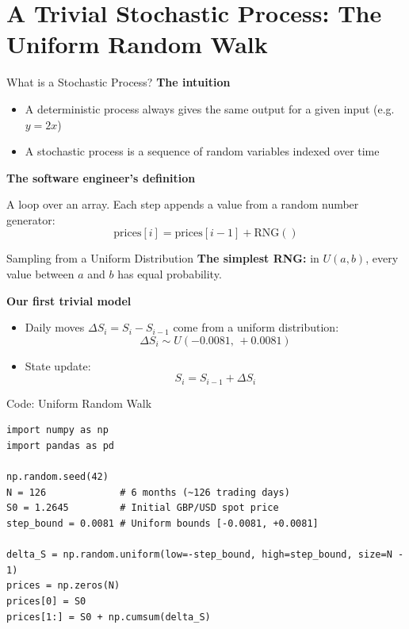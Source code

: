 \documentclass[aspectratio=169,11pt]{beamer}
\begin{document}
\section{A Trivial Stochastic Process: The Uniform Random Walk}

\begin{frame}{What is a Stochastic Process?}
  \textbf{The intuition}
  \begin{itemize}
    \item A deterministic process always gives the same output for a given input (e.g.\ $y = 2x$)
    \item A \alert{stochastic process} is a sequence of random variables indexed over time
  \end{itemize}
  \bigskip

  \textbf{The software engineer's definition}

  A loop over an array. Each step appends a value from a random number generator:
  \[
    \text{prices}[i] = \text{prices}[i-1] + \text{RNG}()
  \]
\end{frame}

\begin{frame}{Sampling from a Uniform Distribution}
  \textbf{The simplest RNG:} in $U(a, b)$, every value between $a$ and $b$ has equal probability.
  \bigskip

  \textbf{Our first trivial model}
  \begin{itemize}
    \item Daily moves $\Delta S_i = S_i - S_{i-1}$ come from a uniform distribution:
    \[
      \Delta S_i \sim U(-0.0081,\, +0.0081)
    \]
    \item State update:
    \[
      S_i = S_{i-1} + \Delta S_i
    \]
  \end{itemize}
\end{frame}

\begin{frame}[fragile]{Code: Uniform Random Walk}
\begin{lstlisting}
import numpy as np
import pandas as pd

np.random.seed(42)
N = 126             # 6 months (~126 trading days)
S0 = 1.2645         # Initial GBP/USD spot price
step_bound = 0.0081 # Uniform bounds [-0.0081, +0.0081]

delta_S = np.random.uniform(low=-step_bound, high=step_bound, size=N - 1)
prices = np.zeros(N)
prices[0] = S0
prices[1:] = S0 + np.cumsum(delta_S)
\end{lstlisting}
\end{frame}
\end{document}
